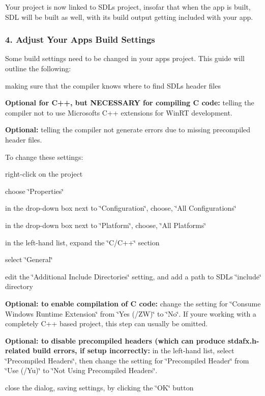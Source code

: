 Your project is now linked to S\+DL\textquotesingle{}s project, insofar that when the app is built, S\+DL will be built as well, with its build output getting included with your app.

\subsubsection*{4. Adjust Your App\textquotesingle{}s Build Settings}

Some build settings need to be changed in your app\textquotesingle{}s project. This guide will outline the following\+:


\begin{DoxyItemize}
\item making sure that the compiler knows where to find S\+DL\textquotesingle{}s header files
\item {\bfseries Optional for C++, but N\+E\+C\+E\+S\+S\+A\+RY for compiling C code\+:} telling the compiler not to use Microsoft\textquotesingle{}s C++ extensions for Win\+RT development.
\item {\bfseries Optional\+:} telling the compiler not generate errors due to missing precompiled header files.
\end{DoxyItemize}

To change these settings\+:


\begin{DoxyEnumerate}
\item right-\/click on the project
\item choose \char`\"{}\+Properties\char`\"{}
\item in the drop-\/down box next to \char`\"{}\+Configuration\char`\"{}, choose, \char`\"{}\+All Configurations\char`\"{}
\item in the drop-\/down box next to \char`\"{}\+Platform\char`\"{}, choose, \char`\"{}\+All Platforms\char`\"{}
\item in the left-\/hand list, expand the \char`\"{}\+C/\+C++\char`\"{} section
\item select \char`\"{}\+General\char`\"{}
\item edit the \char`\"{}\+Additional Include Directories\char`\"{} setting, and add a path to S\+DL\textquotesingle{}s \char`\"{}include\char`\"{} directory
\item {\bfseries Optional\+: to enable compilation of C code\+:} change the setting for \char`\"{}\+Consume Windows Runtime Extension\char`\"{} from \char`\"{}\+Yes (/\+Z\+W)\char`\"{} to \char`\"{}\+No\char`\"{}. If you\textquotesingle{}re working with a completely C++ based project, this step can usually be omitted.
\item {\bfseries Optional\+: to disable precompiled headers (which can produce \textquotesingle{}stdafx.\+h\textquotesingle{}-\/related build errors, if setup incorrectly\+:} in the left-\/hand list, select \char`\"{}\+Precompiled Headers\char`\"{}, then change the setting for \char`\"{}\+Precompiled 
   Header\char`\"{} from \char`\"{}\+Use (/\+Yu)\char`\"{} to \char`\"{}\+Not Using Precompiled Headers\char`\"{}.
\item close the dialog, saving settings, by clicking the \char`\"{}\+O\+K\char`\"{} button
\end{DoxyEnumerate}


